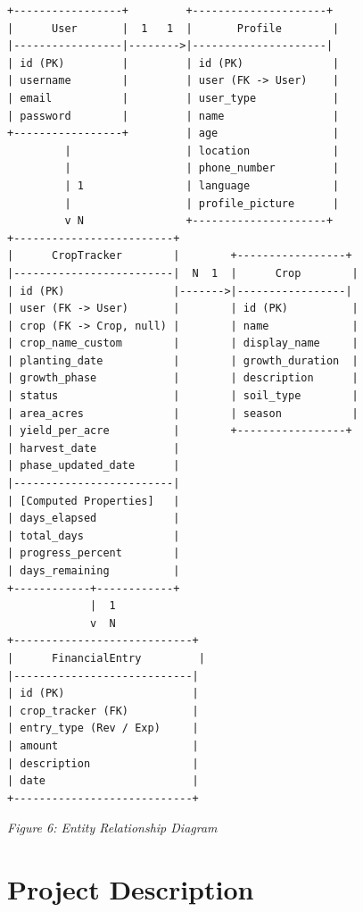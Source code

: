 \documentclass[12pt,a4paper]{article}
\begin{document}
\begin{Verbatim}[fontsize=\small, frame=single]
+-----------------+         +---------------------+
|      User       |  1   1  |       Profile        |
|-----------------|-------->|---------------------|
| id (PK)         |         | id (PK)              |
| username        |         | user (FK -> User)    |
| email           |         | user_type            |
| password        |         | name                 |
+-----------------+         | age                  |
         |                  | location             |
         |                  | phone_number         |
         | 1                | language             |
         |                  | profile_picture      |
         v N                +---------------------+
+-------------------------+
|      CropTracker        |        +-----------------+
|-------------------------|  N  1  |      Crop        |
| id (PK)                 |------->|-----------------|
| user (FK -> User)       |        | id (PK)          |
| crop (FK -> Crop, null) |        | name             |
| crop_name_custom        |        | display_name     |
| planting_date           |        | growth_duration  |
| growth_phase            |        | description      |
| status                  |        | soil_type        |
| area_acres              |        | season           |
| yield_per_acre          |        +-----------------+
| harvest_date            |
| phase_updated_date      |
|-------------------------|
| [Computed Properties]   |
| days_elapsed            |
| total_days              |
| progress_percent        |
| days_remaining          |
+------------+------------+
             |  1
             v  N
+----------------------------+
|      FinancialEntry         |
|----------------------------|
| id (PK)                    |
| crop_tracker (FK)          |
| entry_type (Rev / Exp)     |
| amount                     |
| description                |
| date                       |
+----------------------------+
\end{Verbatim}
\begin{center}
\textit{Figure 6: Entity Relationship Diagram}
\end{center}

\section{Project Description}
\end{document}
